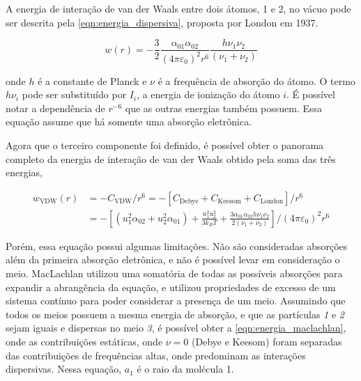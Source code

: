 	A energia de interação de van der Waals entre dois átomos, 1 e 2,  no vácuo pode ser descrita pela \autoref{eqn:energia_dispersiva}, proposta por London em 1937.\cite{London1937}
	
	\begin{equation}
		w(r) = - \frac { 3 } { 2 } \frac { \alpha _ { 01 } \alpha _ { 02 } } { \left( 4 \pi \varepsilon _ { 0 } \right) ^ { 2 } r ^ { 6 } } \frac { h \nu _ { 1 } \nu _ { 2 } } { \left( \nu _ { 1 } + \nu _ { 2 } \right) }
		\label{eqn:energia_dispersiva}
	\end{equation} 
	
	\noindent onde \(h\) é a constante de Planck e \(\nu\) é a frequência de absorção do átomo. O termo \(h\nu_i\) pode ser substituído por \(I_i\), a energia de ionização do átomo \(i\). É possível notar a dependência de \(r^{-6}\) que as outras energias também possuem. Essa equação assume que há somente uma absorção eletrônica. 
	
	Agora que o terceiro componente foi definido, é possível obter o panorama completo da energia de interação de van der Waals obtido pela soma das três energias,
	
	\begin{subequations}
	\begin{align}
		w_{\mathrm{VDW}}(r) &= -C_{\mathrm{VDW}}/r^{6} = -\left[C_{\mathrm{Debye}}+C_{\mathrm{Keesom}}+C_{\mathrm{London}}\right]/r^{6} \label{eqn:vdw_geral} \\
							&= - \left[ \left( u_{1}^{2}\alpha_{02} + u_{2}^{2}\alpha_{01} \right)   + \frac{u_{1}^{2}u_{2}^{2}}{3k_BT} + \frac{3\alpha_{01}\alpha_{02}h\nu_{1}\nu_{2}}{2\left(\nu_{1} + \nu_{2}\right)}\right]/\left(4\pi\varepsilon_{0}\right)^{2}r^{6} \label{eqn:vdw_completa}
	\end{align}
	\label{eqn:vdw}
	\end{subequations} 
	
	Porém, essa equação possui algumas limitações. Não são consideradas absorções além da primeira absorção eletrônica, e não é possível levar em consideração o meio. \mbox{MacLachlan} utilizou uma somatória de todas as possíveis absorções para expandir a abrangência da equação, e utilizou propriedades de excesso de um sistema contínuo para poder considerar a presença de um meio. Assumindo que todos os meios possuem a mesma energia de absorção, e que as partículas \emph{1} e \emph{2} sejam iguais e dispersas no meio \emph{3}, é possível obter a \autoref{eqn:energia_maclachlan}, onde as contribuições estáticas, onde \(\nu = 0\) (Debye e Keesom) foram separadas das contribuições de frequências altas, onde predominam as interações dispersivas. Nessa equação, \(a_1\) é o raio da molécula 1.
	

